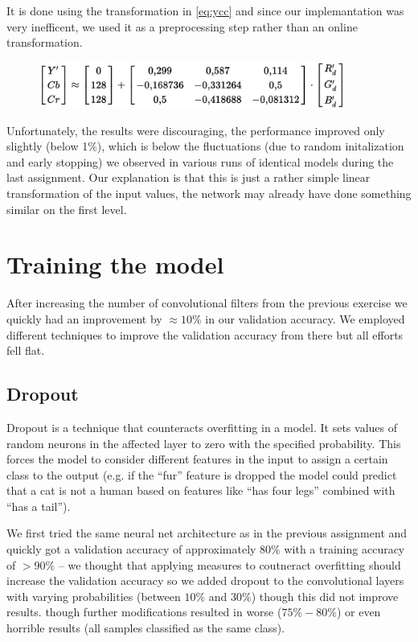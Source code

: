 It is done using the transformation in \eqref{eq:ycc} and since our implemantation was very inefficent, we used it as a preprocessing step rather than an online transformation. 
\begin{figure}
\includegraphics[width=0.9\textwidth]{./img/rgb-ycc.png}
\label{YCCformula}
\end{figure}
Unfortunately, the results were discouraging, the performance improved only slightly (below 1\%), which is below the fluctuations (due to random initalization and early stopping) we observed in various runs of identical models during the last assignment. Our explanation is that this is just a rather simple linear transformation of the input values, the network may already have done something similar on the first level. 




\section{Training the model}
After increasing the number of convolutional filters from the previous exercise we quickly had an improvement by $\approx 10\%$ in our validation accuracy. We employed different techniques to improve the validation accuracy from there but all efforts fell flat. 

\subsection{Dropout}
Dropout is a technique that counteracts overfitting in a model. It sets values of random neurons in the affected layer to zero with the specified probability. This forces the model to consider different features in the input to assign a certain class to the output (e.g. if the ``fur'' feature is dropped the model could predict that a cat is not a human based on features like ``has four legs'' combined with ``has a tail''). 


We first tried the same neural net architecture as in the previous assignment and quickly got a validation accuracy of approximately $80\%$ with a training accuracy of $>90\%$ -- we thought that applying measures to coutneract overfitting should increase the validation accuracy so we added dropout to the convolutional layers with varying probabilities (between $10\%$ and $30\%$) though this did not improve results.
though further modifications resulted in worse ($75\% - 80\%$) or even horrible results (all samples classified as the same class). 




